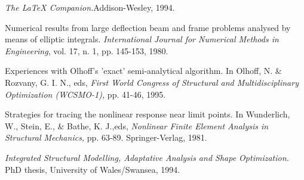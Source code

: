 \begin{thebibliography}{99}



  \textit{The LaTeX
Companion.}Addison-Wesley, 1994.

 Numerical results from large deflection beam and frame
problems analysed by means of elliptic integrals.
\textit{International Journal for Numerical Methods in
Engineering}, vol. 17, n. 1, pp. 145-153, 1980.

 Experiences with
Olhoff's 'exact' semi-analytical algorithm. In Olhoff, N. \&
Rozvany, G. I. N., eds, \textit{First World Congress of Structural
and Multidisciplinary Optimization (WCSMO-1),} pp. 41-46, 1995.

  Strategies for tracing the nonlinear response
near limit points. In Wunderlich, W., Stein, E., \& Bathe, K.
J.,eds, \textit{Nonlinear Finite Element Analysis in Structural
Mechanics,} pp. 63-89. Springer-Verlag, 1981.

 \textit{Integrated Structural Modelling, Adaptative
Analysis and Shape Optimization.} PhD thesis, University of
Wales/Swansea, 1994.



\end{thebibliography}
